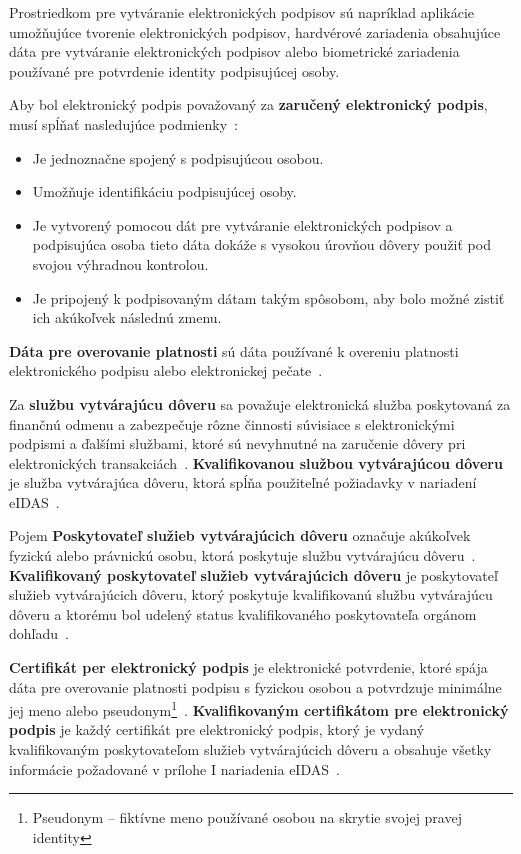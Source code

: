 \documentclass[
  digital,     %
  oneside,     %
  nosansbold,  %
  nocolorbold, %
  lof,         %
  nolot,         %
]{fithesis4}
\begin{document}
\noindent
Prostriedkom pre vytváranie elektronických podpisov sú napríklad aplikácie umožňujúce tvorenie elektronických podpisov, hardvérové zariadenia obsahujúce dáta pre vytváranie elektronických podpisov alebo biometrické zariadenia používané pre potvrdenie identity podpisujúcej osoby. 

Aby bol elektronický podpis považovaný za \textbf{zaručený elektronický podpis}, musí spĺňať nasledujúce podmienky~\cite[čl.~3,~odst.~11]{eidas2024}:
\newpage
\begin{itemize}
    \item Je jednoznačne spojený s podpisujúcou osobou.
    \item Umožňuje identifikáciu podpisujúcej osoby.
    \item Je vytvorený pomocou dát pre vytváranie elektronických podpisov a podpisujúca osoba tieto dáta dokáže s vysokou úrovňou dôvery použiť pod svojou výhradnou kontrolou.
    \item Je pripojený k podpisovaným dátam takým spôsobom, aby bolo možné zistiť ich akúkoľvek následnú zmenu.~\cite[čl.~26]{eidas2024}
\end{itemize}

\noindent
\textbf{Dáta pre overovanie platnosti} sú dáta používané k overeniu platnosti elektronického podpisu alebo elektronickej pečate~\cite[čl.~3,~odst.~40]{eidas2024}.

Za \textbf{službu vytvárajúcu dôveru} sa považuje elektronická služba poskytovaná za finančnú odmenu a zabezpečuje rôzne činnosti súvisiace s elektronickými podpismi a ďalšími službami, ktoré sú nevyhnutné na zaručenie dôvery pri elektronických transakciách~\cite[čl.~3,~odst.~16]{eidas2024}. \textbf{Kvalifikovanou službou vytvárajúcou dôveru} je služba vytvárajúca dôveru, ktorá spĺňa použiteľné požiadavky v nariadení eIDAS~\cite[čl.~3,~odst.~17]{eidas2024}.

Pojem \textbf{Poskytovateľ služieb vytvárajúcich dôveru} označuje akúkoľvek fyzickú alebo právnickú osobu, ktorá poskytuje službu vytvárajúcu dôveru~\cite[čl.~3,~odst.~19]{eidas2024}. \textbf{Kvalifikovaný poskytovateľ služieb vytvárajúcich dôveru} je poskytovateľ služieb vytvárajúcich dôveru, ktorý poskytuje kvalifikovanú službu vytvárajúcu dôveru a ktorému bol udelený status kvalifikovaného poskytovateľa orgánom dohľadu~\cite[čl.~3,~odst.~20]{eidas2024}.

\textbf{Certifikát per elektronický podpis} je elektronické potvrdenie, ktoré spája dáta pre overovanie platnosti podpisu s fyzickou osobou a potvrdzuje minimálne jej meno alebo pseudonym\footnote{Pseudonym -- fiktívne meno používané osobou na skrytie svojej pravej identity}~\cite[čl.~3,~odst.~14]{eidas2024}. \textbf{Kvalifikovaným certifikátom pre elektronický podpis} je každý certifikát pre elektronický podpis, ktorý je vydaný kvalifikovaným poskytovateľom služieb vytvárajúcich dôveru a obsahuje všetky informácie požadované v prílohe I nariadenia eIDAS~\cites[čl.~3,~odst.~15]{eidas2024}[príloha I]{eidas2024}.
\end{document}
